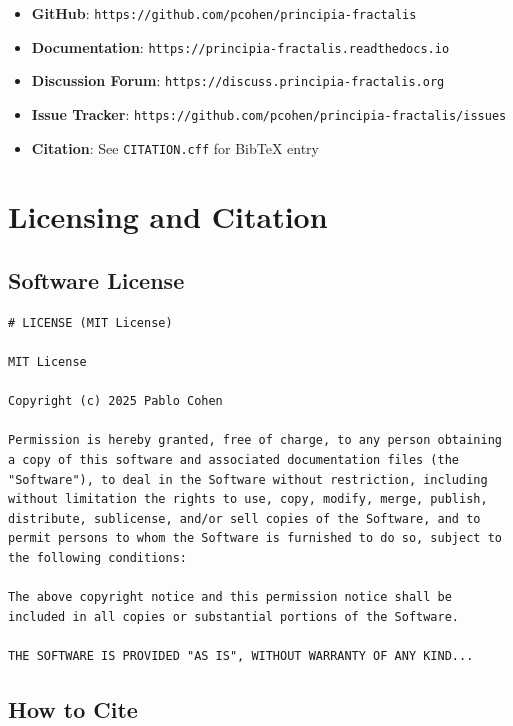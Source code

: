 \begin{itemize}
\item \textbf{GitHub}: \texttt{https:/\allowbreak{}/\allowbreak{}github.\allowbreak{}com/\allowbreak{}pcohen/\allowbreak{}principia-fractalis}
\item \textbf{Documentation}: \texttt{https:/\allowbreak{}/\allowbreak{}principia-fractalis.\allowbreak{}readthedocs.\allowbreak{}io}
\item \textbf{Discussion Forum}: \texttt{https:/\allowbreak{}/\allowbreak{}discuss.\allowbreak{}principia-fractalis.\allowbreak{}org}
\item \textbf{Issue Tracker}: \texttt{https:/\allowbreak{}/\allowbreak{}github.\allowbreak{}com/\allowbreak{}pcohen/\allowbreak{}principia-fractalis/\allowbreak{}issues}
\item \textbf{Citation}: See \texttt{CITATION.cff} for BibTeX entry
\end{itemize}

\section{Licensing and Citation}
\label{sec:licensing}

\subsection{Software License}

\begin{verbatim}
# LICENSE (MIT License)

MIT License

Copyright (c) 2025 Pablo Cohen

Permission is hereby granted, free of charge, to any person obtaining
a copy of this software and associated documentation files (the
"Software"), to deal in the Software without restriction, including
without limitation the rights to use, copy, modify, merge, publish,
distribute, sublicense, and/or sell copies of the Software, and to
permit persons to whom the Software is furnished to do so, subject to
the following conditions:

The above copyright notice and this permission notice shall be
included in all copies or substantial portions of the Software.

THE SOFTWARE IS PROVIDED "AS IS", WITHOUT WARRANTY OF ANY KIND...
\end{verbatim}

\subsection{How to Cite}

